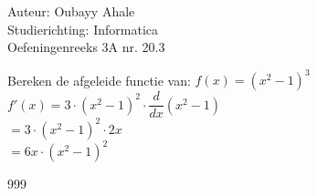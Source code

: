 \documentclass[a4paper]{article}
\begin{document}
  
\noindent \large Auteur: Oubayy Ahale          \\
\noindent \large Studierichting: Informatica   \\
\noindent \large Oefeningenreeks 3A nr. 20.3  \\

\medskip

\normalsize

Bereken de afgeleide functie van: $ f(x) = (x^2 - 1)^3 $\\

$ f'(x) = 3 \cdot (x^2 - 1)^2 \cdot \dfrac{d}{dx} (x^2 - 1) $\\

$ = 3 \cdot (x^2 - 1)^2 \cdot 2x $\\

$ = 6x \cdot (x^2 - 1)^2 $\\

\begin{thebibliography}{999}
\end{thebibliography}
\end{document}
